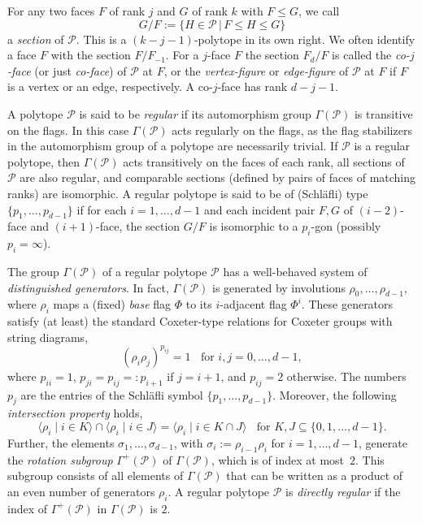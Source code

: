 \documentclass[12pt]{amsart}
\theoremstyle{definition}
\begin{document}
For any two faces $F$ of rank $j$ and $G$ of rank $k$ with $F \leq G$, we call
\[G/F := \{ H \in \mathcal{P}\, | \, F \leq H \leq G \}\] 
a \textit{section} of $\mathcal{P}$. This is a $(k-j-1)$-polytope in its own right. We often identify a face $F$ with the section $F/F_{-1}$. For a $j$-face $F$ the section $F_{d}/F$ is called the \textit{co-$j$-face\/} (or just \textit{co-face\/}) of $\mathcal{P}$ at $F$, or the \emph{vertex-figure\/} or \emph{edge-figure\/} of $\mathcal{P}$ at $F$ if $F$ is a vertex or an edge, respectively. A co-$j$-face has rank $d-j-1$.

A polytope $\mathcal{P}$ is said to be \emph{regular\/} if its automorphism group $\Gamma(\mathcal{P})$ is transitive on the flags. In this case $\Gamma(\mathcal{P})$ acts regularly on the flags, as the flag stabilizers in the automorphism group of a polytope are necessarily trivial. If $\mathcal{P}$ is a regular polytope, then $\Gamma(\mathcal{P})$ acts transitively on the faces of each rank, all sections of $\mathcal{P}$ are also regular, and comparable sections (defined by pairs of faces of matching ranks) are isomorphic. A regular polytope is said to be of (Schl\"afli) type $\{p_1,\ldots,p_{d-1}\}$ if for each $i=1,\ldots,d-1$ and each incident pair $F,G$ of $(i-2)$-face and $(i+1)$-face, the section $G/F$ is isomorphic to a $p_i$-gon (possibly $p_{i}=\infty$). 

The group $\Gamma(\mathcal{P})$ of a regular polytope $\mathcal{P}$ has a well-behaved system of \textit{distinguished generators\/}. In fact, $\Gamma(\mathcal{P})$ is generated by involutions $\rho_0,\ldots,\rho_{d-1}$, where $\rho_i$ maps a (fixed) \textit{base\/} flag $\Phi$ to its $i$-adjacent flag $\Phi^i$. These generators satisfy (at least) the standard Coxeter-type relations for Coxeter groups with string diagrams, 
\begin{equation}
\label{standardrel}
(\rho_i \rho_j)^{p_{ij}} = 1 \;\; \textrm{ for } i,j=0, \ldots,d-1,
\end{equation}
where $p_{ii}=1$, $p_{ji} = p_{ij} =: p_{i+1}$ if $j=i+1$, and $p_{ij}=2$ otherwise. The numbers $p_j$ are the entries of the Schl\"afli symbol $\{p_{1},\ldots,p_{d-1}\}$. Moreover, the following {\em intersection property\/} holds,
\begin{equation}
\label{intprop}
\langle \rho_i \mid i \in K \rangle \cap \langle \rho_i \mid i \in J \rangle
= \langle \rho_i \mid i \in {K \cap J} \rangle
  \;\; \textrm{ for } K,J \subseteq \{0,1,\ldots,d-1\}.
\end{equation}
Further, the elements $\sigma_{1},\ldots,\sigma_{d-1}$, with $\sigma_{i}:=\rho_{i-1}\rho_{i}$ for $i=1,\ldots,d-1$, generate the {\em rotation subgroup\/} $\Gamma^{+}(\mathcal{P})$ of $\Gamma(\mathcal{P})$, which is of index at most~$2$. This subgroup consists of all elements of $\Gamma(\mathcal{P})$ that can be written as a product of an even number of generators $\rho_i$. A regular polytope $\mathcal{P}$ is {\em directly regular\/} if the index of $\Gamma^{+}(\mathcal{P})$ in $\Gamma(\mathcal{P})$ is $2$.
\end{document}
